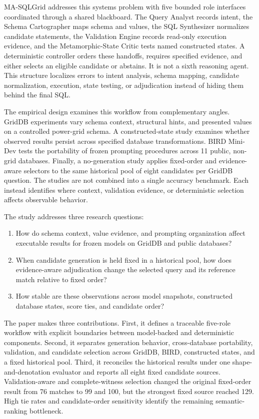 \documentclass[applsci,article,submit,moreauthors]{Definitions/mdpi}
\newcommand{\masql}{MA-SQLGrid}
\begin{document}
\masql{} addresses this systems problem with five bounded role interfaces coordinated through a shared blackboard. The Query Analyst records intent, the Schema Cartographer maps schema and values, the SQL Synthesizer normalizes candidate statements, the Validation Engine records read-only execution evidence, and the Metamorphic-State Critic tests named constructed states. A deterministic controller orders these handoffs, requires specified evidence, and either selects an eligible candidate or abstains. It is not a sixth reasoning agent. This structure localizes errors to intent analysis, schema mapping, candidate normalization, execution, state testing, or adjudication instead of hiding them behind the final SQL.

The empirical design examines this workflow from complementary angles. GridDB experiments vary schema context, structural hints, and presented values on a controlled power-grid schema. A constructed-state study examines whether observed results persist across specified database transformations. BIRD Mini-Dev tests the portability of frozen prompting procedures across 11 public, non-grid databases. Finally, a no-generation study applies fixed-order and evidence-aware selectors to the same historical pool of eight candidates per GridDB question. The studies are not combined into a single accuracy benchmark. Each instead identifies where context, validation evidence, or deterministic selection affects observable behavior.

The study addresses three research questions:
\begin{enumerate}
\item How do schema context, value evidence, and prompting organization affect executable results for frozen models on GridDB and public databases?
\item When candidate generation is held fixed in a historical pool, how does evidence-aware adjudication change the selected query and its reference match relative to fixed order?
\item How stable are these observations across model snapshots, constructed database states, score ties, and candidate order?
\end{enumerate}

The paper makes three contributions. First, it defines a traceable five-role workflow with explicit boundaries between model-backed and deterministic components. Second, it separates generation behavior, cross-database portability, validation, and candidate selection across GridDB, BIRD, constructed states, and a fixed historical pool. Third, it reconciles the historical results under one shape-and-denotation evaluator and reports all eight fixed candidate sources. Validation-aware and complete-witness selection changed the original fixed-order result from 76 matches to 99 and 100, but the strongest fixed source reached 129. High tie rates and candidate-order sensitivity identify the remaining semantic-ranking bottleneck.
\end{document}
